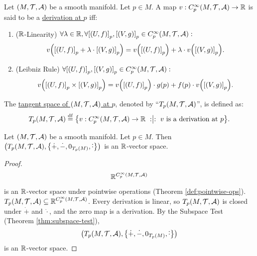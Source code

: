 \documentclass[11pt,reqno]{amsart}
\newcommand{\pwplus}{\mathbin{\dot{+}}}
\newcommand{\pwminus}{\mathbin{\dot{-}}}
\newcommand{\pwcdot}{\mathbin{\dot{\cdot}}}
\begin{document}
\begin{Def}
Let $(M,\mathcal{T},\mathcal{A})$ be a smooth manifold. Let $p\in M$.
A map $v:C_p^\infty(M,\mathcal{T},\mathcal{A})\to\mathbb{R}$ is said to be a \ul{derivation at $p$} iff:
\begin{enumerate}
\item ($\mathbb{R}$-Linearity)
$
\forall\lambda\in\R,\forall \SqBr{(U,f)}_p,\SqBr{(V,g)}_p\in C_p^\infty(M,\T,\A):
$
\[
v\Br{\SqBr{(U,f)}_p+\lambda\cdot\SqBr{(V,g)}_p}
=v\Br{\SqBr{(U,f)}_p}+\lambda\cdot v\Br{\SqBr{(V,g)}_p}.
\]
\item (Leibniz Rule)
$
\forall \SqBr{(U,f)}_p,\SqBr{(V,g)}_p\in C_p^\infty(M,\T,\A):
$
\[
v\Br{\SqBr{(U,f)}_p\times\SqBr{(V,g)}_p}
=v\Br{\SqBr{(U,f)}_p}\cdot g(p)+f(p)\cdot v\Br{\SqBr{(V,g)}_p}.
\]
\end{enumerate}
The \ul{tangent space of $(M,\mathcal{T},\mathcal{A})$ at $p$}, denoted by
``$T_p(M,\mathcal{T},\mathcal{A})$'', is defined as:
\[
T_p(M,\T,\A)\df\set{v:C_p^\infty(M,\T,\A)\to\R\st
v~\text{is a derivation at $p$}}.
\]
\end{Def}

\begin{Thm}\label{thm:tangent-vec-space}
Let $(M,\mathcal{T},\mathcal{A})$ be a smooth manifold. Let $p\in M$.
Then $\Br{T_p(M,\T,\A),\set{\pwplus,\pwminus,0_{T_p(M)},\pwcdot}}$ is an $\mathbb{R}$-vector space.
\end{Thm}
\begin{proof}
\[
\mathbb{R}^{C_p^\infty(M,\mathcal{T},\mathcal{A})}
\]
is an $\mathbb{R}$-vector space under pointwise operations
(Theorem \ref{def:pointwise-ops}).
$T_p(M,\mathcal{T},\mathcal{A})\subseteq\mathbb{R}^{C_p^\infty(M,\mathcal{T},\mathcal{A})}$.
Every derivation is linear, so $T_p(M,\mathcal{T},\mathcal{A})$ is closed under $\pwplus$
and $\pwcdot$, and the zero map is a derivation.
By the Subspace Test (Theorem \ref{thm:subspace-test}),
\[
\Br{T_p(M,\T,\A),\set{\pwplus,\pwminus,0_{T_p(M)},\pwcdot}}
\]
is an $\mathbb{R}$-vector space.
\end{proof}
\end{document}
